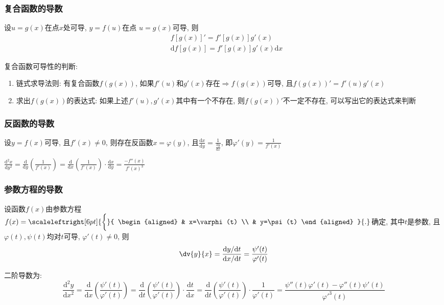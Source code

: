 \subsubsection{复合函数的导数}
设$ u=g(x) $在点$ x $处可导, $ y=f(u) $在点 $ u=g(x) $可导, 则
\begin{equation*}
    \begin{aligned}
         & {f[g(x)]}'=f'[g(x)]g'(x)                     \\
         & \mathrm{d}{f[g(x)]}=f'[g(x)]g'(x)\mathrm{d}x
    \end{aligned}
\end{equation*}
\begin{tcolorbox}
    复合函数可导性的判断:
    \begin{enumerate}
        \item 链式求导法则: 有复合函数$ f(g(x)) $, 如果$ f'(u) $和$ g'(x) $存在$ \Rightarrow f(g(x)) $可导, 且$ f(g(x))'=f'(u)g'(x) $
        \item 求出$ f(g(x)) $的表达式: 如果上述$ f'(u), g'(x) $其中有一个不存在, 则$ f(g(x))' $不一定不存在, 可以写出它的表达式来判断
    \end{enumerate}
\end{tcolorbox}
\subsubsection{反函数的导数}
设$ y=f(x) $可导, 且$ f'(x)\neq 0 $, 则存在反函数$ x=\varphi(y) $, 且$ \frac{\mathrm{d}x}{\mathrm{d}y}=\frac{1}{\frac{\mathrm{d}y}{\mathrm{d}x}} $, 即$ \varphi'(y)=\frac{1}{f'(x)} $ \par
$ \frac{\mathrm{d}^{2}x}{\mathrm{d}y^{2}}=\frac{\mathrm{d}}{\mathrm{d}y}(\frac{1}{f'(x)})=\frac{\mathrm{d}}{\mathrm{d}x}(\frac{1}{f'(x)})\cdot\frac{\mathrm{d}x}{\mathrm{d}y}=\frac{-f''(x)}{f'(x)^{3}} $
\subsubsection{参数方程的导数}
设函数$ f(x) $由参数方程$ f(x)=\scaleleftright[6pt]{\biggl\{}{
        \begin{aligned}
             & x=\varphi (t) \\
             & y=\psi (t)
        \end{aligned}
    }{.} $确定, 其中$ t $是参数, 且$ \varphi(t), \psi(t) $均对$ t $可导, $ \varphi'(t)\neq 0 $, 则
\begin{equation*}
    \dv{y}{x}=\frac{\mathrm{d}y/\mathrm{d}t}{\mathrm{d}x/\mathrm{d}t}=\frac{\psi'(t)}{\varphi'(t)}
\end{equation*}\par
二阶导数为:
\begin{equation*}
    \frac{\mathrm{d}^{2}y}{\mathrm{d}x^{2}}=\frac{\mathrm{d}}{\mathrm{d}x}(\frac{\psi'(t)}{\varphi'(t)})=\frac{\mathrm{d}}{\mathrm{d}t}(\frac{\psi'(t)}{\varphi'(t)})\cdot\frac{\mathrm{d}t}{\mathrm{d}x}=\frac{\mathrm{d}}{\mathrm{d}t}(\frac{\psi'(t)}{\varphi'(t)})\cdot\frac{1}{\varphi'(t)}=\frac{\psi''(t)\varphi'(t)-\varphi''(t)\psi'(t)}{\varphi'^{3}(t)}
\end{equation*}
